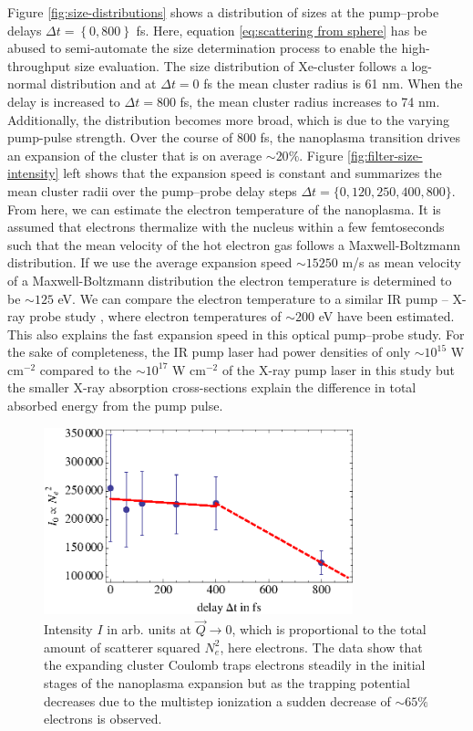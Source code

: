 Figure \ref{fig:size-distributions} shows a distribution of sizes at the pump--probe delays $\Delta t = \left\{0,800\right\}$ fs. Here, equation \eqref{eq:scattering from sphere} has be abused to semi-automate the size determination process to enable the high-throughput size evaluation. The size distribution of Xe-cluster follows a log-normal distribution \citep{Schutte-2002-IJMS} and at $\Delta t=0$ fs the mean cluster radius is 61 nm. When the delay is increased to $\Delta t=800$ fs, the mean cluster radius increases to 74 nm. Additionally, the distribution becomes more broad, which is due to the varying pump-pulse strength. Over the course of 800 fs, the nanoplasma transition drives an expansion of the cluster that is on average $\sim 20 \%$. Figure \ref{fig:filter-size-intensity} left shows that the expansion speed is constant and summarizes the mean cluster radii over the pump--probe delay steps $\Delta t=\{0,120,250,400,800\}$. From here, we can estimate the electron temperature of the nanoplasma. It is assumed that electrons thermalize with the nucleus within a few femtoseconds such that the mean velocity of the hot electron gas follows a Maxwell-Boltzmann distribution. If we use the average expansion speed $\sim 15250$ m/s as mean velocity of a Maxwell-Boltzmann distribution the electron temperature is determined to be $\sim 125$ eV. We can compare the electron temperature to a similar IR pump -- X-ray probe study \citep{Gorkhover-2016-NatPho}, where electron temperatures of $\sim 200$ eV have been estimated. This also explains the fast expansion speed in this optical pump--probe study. For the sake of completeness, the IR pump laser had power densities of only $\sim 10^{15}$ W cm$^{-2}$ compared to the $\sim 10^{17}$ W cm$^{-2}$ of the X-ray pump laser in this study but the smaller X-ray absorption cross-sections explain the difference in total absorbed energy from the pump pulse.\\
\begin{figure}
	\centering
		\includegraphics[width=0.80\textwidth]{images/results/number-of-scatterer.eps}
	\caption[Time-resoved reduction of number of scatterer due to nanoplasma expansion]{Intensity $I$ in arb. units at $\vec{Q}\rightarrow 0$, which is proportional to the total amount of scatterer squared $N_{e}^{2}$, here electrons. The data show that the expanding cluster Coulomb traps electrons steadily in the initial stages of the nanoplasma expansion but as the trapping potential decreases due to the multistep ionization a sudden decrease of $\sim 65\%$ electrons is observed.}
	\label{fig:number-of-scatterer}
\end{figure}
